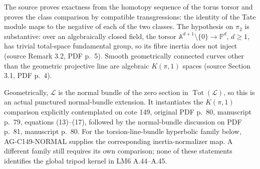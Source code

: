 \documentclass[11pt,a4paper]{article}
\begin{document}
The source proves exactness from the homotopy sequence of the torus
torsor and proves the class comparison by compatible transgressions:
the identity of the Tate module maps to the negative of each of the
two classes. The hypothesis on $\pi_2$ is substantive: over an
algebraically closed field, the torsor
$\mathbb A^{d+1}\setminus\{0\}\to\mathbb P^d$, $d\ge1$, has trivial
total-space fundamental group, so its fibre inertia does not inject
(source Remark 3.2, PDF p.~5). Smooth geometrically connected curves
other than the geometric projective line are algebraic $K(\pi,1)$
spaces (source Section 3.1, PDF p.~4).

Geometrically, $\mathcal L$ is the normal bundle of the zero section in
$\operatorname{Tot}(\mathcal L)$, so this is an actual punctured
normal-bundle extension. It instantiates the $K(\pi,1)$ comparison
explicitly contemplated on cote 149, original PDF p.~80, manuscript
p.~79, equations (13)--(17), followed by the normal-bundle discussion
on PDF p.~81, manuscript p.~80. For the torsion-line-bundle hyperbolic family below,
AG-C149-NORMAL supplies the corresponding inertia-normalizer map.
A different family still requires its own comparison; none of these
statements identifies the global tripod kernel in LM6 A.44--A.45.
\end{document}
